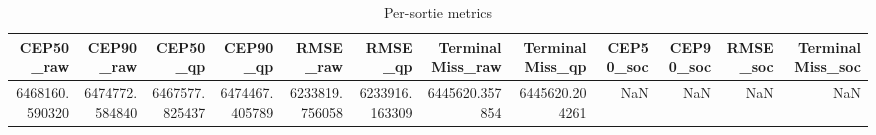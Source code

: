 \begin{table}[t]
\centering
\begin{tabular}{rrrrrrrrrrrr}
\toprule
CEP50_raw & CEP90_raw & CEP50_qp & CEP90_qp & RMSE_raw & RMSE_qp & TerminalMiss_raw & TerminalMiss_qp & CEP50_soc & CEP90_soc & RMSE_soc & TerminalMiss_soc \\
\midrule
6468160.590320 & 6474772.584840 & 6467577.825437 & 6474467.405789 & 6233819.756058 & 6233916.163309 & 6445620.357854 & 6445620.204261 & NaN & NaN & NaN & NaN \\
\bottomrule
\end{tabular}
\caption{Per-sortie metrics}
\label{tab:per_sortie}
\end{table}
